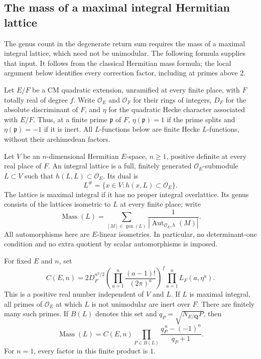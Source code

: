 \subsection{The mass of a maximal integral Hermitian lattice}
\label{sec:maximal-hermitian-mass}

The genus count in the degenerate return sum requires the mass of a
maximal integral lattice, which need not be unimodular.  The following
formula supplies that input.  It follows from the classical Hermitian
mass formula; the local argument below identifies every correction
factor, including at primes above \(2\).

Let \(E/F\) be a CM quadratic extension, unramified at every finite
place, with \(F\) totally real of degree \(f\).  Write \(\mathcal O_E\)
and \(\mathcal O_F\) for their rings of integers, \(D_F\) for the
absolute discriminant of \(F\), and \(\eta\) for the quadratic Hecke
character associated with \(E/F\).  Thus, at a finite prime
\(\mathfrak p\) of \(F\), \(\eta(\mathfrak p)=1\) if the prime splits
and \(\eta(\mathfrak p)=-1\) if it is inert.  All \(L\)-functions below
are finite Hecke \(L\)-functions, without their archimedean factors.

Let \(V\) be an \(n\)-dimensional Hermitian \(E\)-space, \(n\geq1\),
positive definite at every real place of \(F\).  An integral lattice
is a full, finitely generated \(\mathcal O_E\)-submodule \(L\subset V\)
such that \(h(L,L)\subset\mathcal O_E\).  Its dual is
\[
 L^\#=\{x\in V:h(x,L)\subset\mathcal O_E\}.
\]
The lattice is maximal integral if it has no proper integral
overlattice.  Its genus consists of the lattices isometric to \(L\)
at every finite place; write
\[
 \operatorname{Mass}(L)
   =\sum_{[M]\in\operatorname{gen}(L)}
                         \frac1{|\operatorname{Aut}_{\mathcal O_E,h}(M)|}.
\]
All automorphisms here are \(E\)-linear isometries.  In particular, no
determinant-one condition and no extra quotient by scalar
automorphisms is imposed.

\begin{theorem}
\label{thm:maximal-hermitian-mass}
For fixed \(E\) and \(n\), set
\[
 C(E,n)=
 2D_F^{n^2/2}
 \left(\prod_{a=1}^{n}\frac{(a-1)!}{(2\pi)^a}\right)^f
 \prod_{a=1}^{n}L_F(a,\eta^a).
 \tag{MM1}
\]
This is a positive real number independent of \(V\) and \(L\).
If \(L\) is maximal integral, all primes of \(\mathcal O_E\) at which
\(L\) is not unimodular are inert over \(F\).  There are finitely many
such primes.  If \(B(L)\) denotes this set and
\(q_P=\sqrt{N_{E/\mathbf Q}P}\), then
\[
 \operatorname{Mass}(L)
   =C(E,n)\prod_{P\in B(L)}
               \frac{q_P^{\,n}-(-1)^n}{q_P+1}.
 \tag{MM2}
\]
For \(n=1\), every factor in this finite product is \(1\).
\end{theorem}

